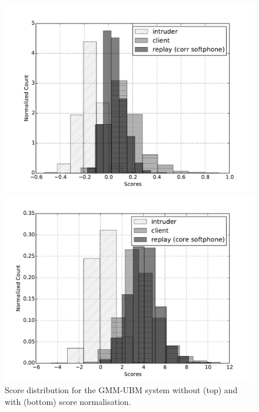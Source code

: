 \begin{figure}
	\centering
	\begin{minipage}{.5\textwidth}
	\includegraphics[width=1\linewidth]{Figs/dist_GMM_corr_iPhone.pdf}
	\end{minipage}


	\begin{minipage}{0.5\textwidth}
	\includegraphics[width=1\linewidth]{Figs/dist_GMM_T_corr_iPhone.pdf}
	\end{minipage}

	\caption{Score distribution for the GMM-UBM system without (top) and with (bottom) score normalisation.}
	\label{fig::Dist_GMM.T_corr}

\end{figure}



